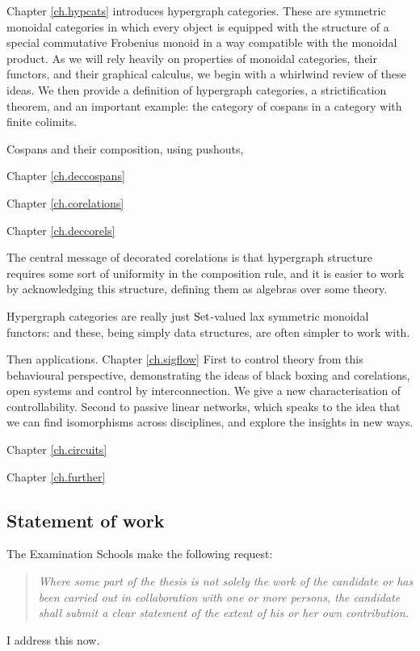 Chapter \ref{ch.hypcats} introduces hypergraph categories. These are symmetric
monoidal categories in which every object is equipped with the structure of a
special commutative Frobenius monoid in a way compatible with the monoidal
product. As we will rely heavily on properties of monoidal categories, their
functors, and their graphical calculus, we begin with a whirlwind review of
these ideas. We then provide a definition of hypergraph categories, a
strictification theorem, and an important example: the category of cospans in a
category with finite colimits.

Cospans and their composition, using pushouts, 

Chapter \ref{ch.deccospans}

Chapter \ref{ch.corelations}

Chapter \ref{ch.deccorels}

The central message of decorated corelations is that hypergraph structure
requires some sort of uniformity in the composition rule, and it is easier to
work by acknowledging this structure, defining them as algebras over some
theory. 

Hypergraph categories are really just $\mathrm{Set}$-valued lax symmetric monoidal
functors: and these, being simply data structures, are often simpler to work
with.


Then applications. Chapter \ref{ch.sigflow} First to control theory from this behavioural perspective,
demonstrating the ideas of black boxing and corelations, open systems and
control by interconnection. We give a new characterisation of controllability.
Second to passive linear networks, which speaks to the idea that we can find
isomorphisms across disciplines, and explore the insights in new ways.

Chapter \ref{ch.circuits}

Chapter \ref{ch.further}


\subsection*{Statement of work}

The Examination Schools make the following request:
\begin{quote}
\emph{Where some part of the thesis is not solely the work of the candidate or
has been carried out in collaboration with one or more persons, the candidate
shall submit a clear statement of the extent of his or her own contribution.}
\end{quote}
I address this now. 

